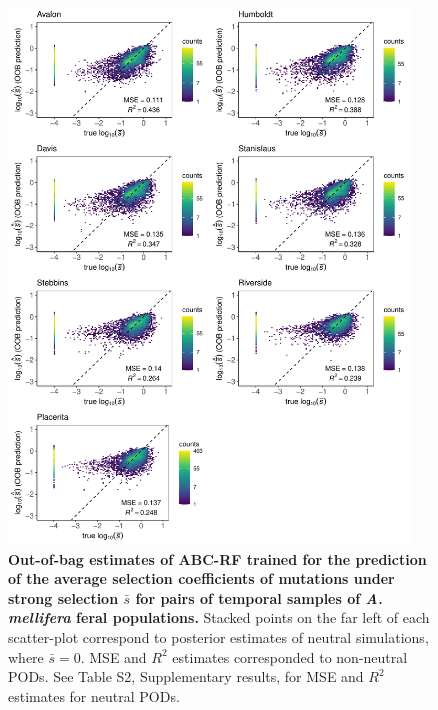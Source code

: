 \documentclass[a4paper, 12pt]{article}
\begin{document}
\begin{figure}[ht]
  \centering
  \includegraphics[width=0.95\textwidth]{Figures/FigureS20_combined_plot_gammasel.pdf}
  \small\caption{\textbf{Out-of-bag estimates of ABC-RF trained for the prediction of the average selection coefficients of mutations under strong selection $\bar{s}$ for pairs of temporal samples of \textit{A. mellifera} feral populations.} Stacked points on the far left of each scatter-plot correspond to posterior estimates of neutral simulations, where $\bar{s} = 0$. MSE and $R^2$ estimates corresponded to non-neutral PODs. See Table S2, Supplementary results, for MSE and $R^2$ estimates for neutral PODs.}
  \label{fig:supple_feralbee_gammaselmean}
\end{figure}
\end{document}
